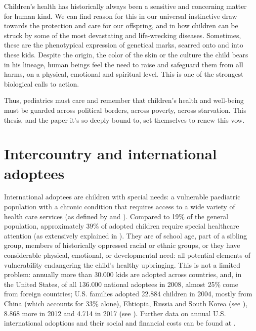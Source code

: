 

\label{chap:introduction}
Children's health has historically always been a sensitive and concerning matter for human kind. We can find reason for this in our universal instinctive draw towards the protection and care for our offspring, and in how children can be struck by some of the most devastating and life-wrecking diseases. Sometimes, these are the phenotypical expression of genetical marks, scarred onto and into these kids. Despite the origin, the color of the skin or the culture the child bears in his lineage, human beings feel the need to raise and safeguard them from all harms, on a physical, emotional and spiritual level. This is one of the strongest biological calls to action.

Thus, pediatrics must care and remember that children's health and well-being must be guarded across political borders, across poverty, across starvation. This thesis, and the paper it's so deeply bound to, set themselves to renew this vow.

\section{Intercountry and international adoptees}\label{sec:internationaladoptees}
International adoptees are children with special needs: a vulnerable paediatric population with a chronic condition that requires access to a wide variety of health care services (as defined by \cite{notonlyinfectious} and \cite{nonsoloinfezioni}). Compared to 19\% of the general population, approximately 39\% of adopted children require special healthcare attention (as extensively explained in \cite{nelson}). They are of school age, part of a sibling group, members of historically oppressed racial or ethnic groups, or they have considerable physical, emotional, or developmental need: all potential elements of vulnerability endangering the child's healthy upbringing. This is not a limited problem: annually more than 30.000 kids are adopted across countries, and, in the United States, of all 136.000 national adoptees in 2008, almost 25\% come from foreign countries; U.S. families adopted 22.884 children in 2004, mostly from China (which accounts for 33\% alone), Ehtiopia, Russia and South Korea (see \cite{nelson}), 8.868 more in 2012 and 4.714 in 2017 (see \cite{usreport}). Further data on annual U.S. international adoptions and their social and financial costs can be found at \cite{usreportsite}.


